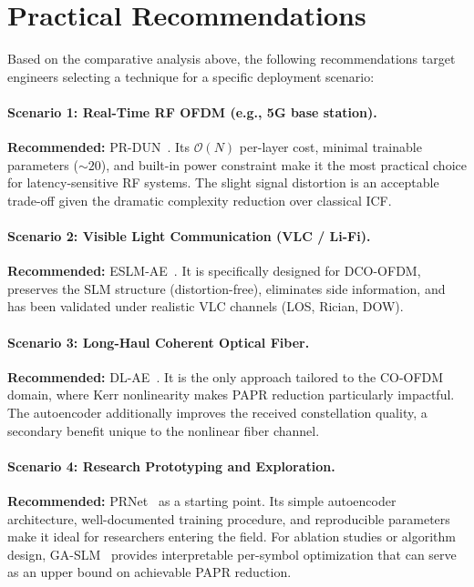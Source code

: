 \section{Practical Recommendations}
\label{sec:practical_recommendations}

Based on the comparative analysis above, the following recommendations
target engineers selecting a technique for a specific deployment scenario:

\paragraph{Scenario 1: Real-Time RF OFDM (e.g., 5G base station).}
\textbf{Recommended:} PR-DUN~\cite{nguyen2022deep}.
Its $\mathcal{O}(N)$ per-layer cost, minimal trainable parameters ($\sim 20$),
and built-in power constraint make it the most practical choice for
latency-sensitive RF systems.  The slight signal distortion is an acceptable
trade-off given the dramatic complexity reduction over classical ICF.

\paragraph{Scenario 2: Visible Light Communication (VLC / Li-Fi).}
\textbf{Recommended:} ESLM-AE~\cite{hao2019extended}.
It is specifically designed for DCO-OFDM, preserves the SLM structure
(distortion-free), eliminates side information, and has been validated
under realistic VLC channels (LOS, Rician, DOW).

\paragraph{Scenario 3: Long-Haul Coherent Optical Fiber.}
\textbf{Recommended:} DL-AE~\cite{alnaseri2025deep}.
It is the only approach tailored to the CO-OFDM domain, where Kerr
nonlinearity makes PAPR reduction particularly impactful.  The autoencoder
additionally improves the received constellation quality, a secondary benefit
unique to the nonlinear fiber channel.

\paragraph{Scenario 4: Research Prototyping and Exploration.}
\textbf{Recommended:} PRNet~\cite{kim2017novel} as a starting point.
Its simple autoencoder architecture, well-documented training procedure,
and reproducible parameters make it ideal for researchers entering the
field.  For ablation studies or algorithm design, GA-SLM~\cite{ali2016new}
provides interpretable per-symbol optimization that can serve as an
upper bound on achievable PAPR reduction.

